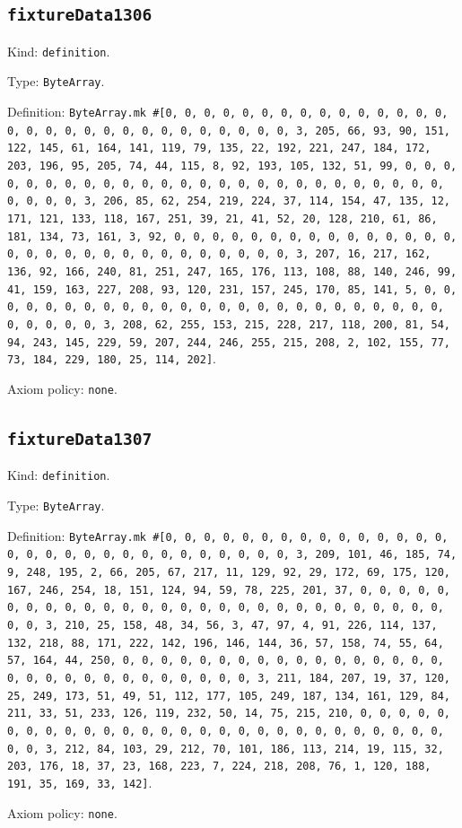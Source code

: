 \documentclass[11pt]{article}
\begin{document}
\subsection*{\texttt{fixtureData1306}}
\noindent Kind: \texttt{definition}.\par
\noindent Type: \texttt{ByteArray}.\par
\noindent Definition: \texttt{ByteArray.mk \#[0, 0, 0, 0, 0, 0, 0, 0, 0, 0, 0, 0, 0, 0, 0, 0, 0, 0, 0, 0, 0, 0, 0, 0, 0, 0, 0, 0, 0, 0, 3, 205, 66, 93, 90, 151, 122, 145, 61, 164, 141, 119, 79, 135, 22, 192, 221, 247, 184, 172, 203, 196, 95, 205, 74, 44, 115, 8, 92, 193, 105, 132, 51, 99, 0, 0, 0, 0, 0, 0, 0, 0, 0, 0, 0, 0, 0, 0, 0, 0, 0, 0, 0, 0, 0, 0, 0, 0, 0, 0, 0, 0, 0, 0, 3, 206, 85, 62, 254, 219, 224, 37, 114, 154, 47, 135, 12, 171, 121, 133, 118, 167, 251, 39, 21, 41, 52, 20, 128, 210, 61, 86, 181, 134, 73, 161, 3, 92, 0, 0, 0, 0, 0, 0, 0, 0, 0, 0, 0, 0, 0, 0, 0, 0, 0, 0, 0, 0, 0, 0, 0, 0, 0, 0, 0, 0, 0, 0, 3, 207, 16, 217, 162, 136, 92, 166, 240, 81, 251, 247, 165, 176, 113, 108, 88, 140, 246, 99, 41, 159, 163, 227, 208, 93, 120, 231, 157, 245, 170, 85, 141, 5, 0, 0, 0, 0, 0, 0, 0, 0, 0, 0, 0, 0, 0, 0, 0, 0, 0, 0, 0, 0, 0, 0, 0, 0, 0, 0, 0, 0, 0, 0, 3, 208, 62, 255, 153, 215, 228, 217, 118, 200, 81, 54, 94, 243, 145, 229, 59, 207, 244, 246, 255, 215, 208, 2, 102, 155, 77, 73, 184, 229, 180, 25, 114, 202]}.\par
\noindent Axiom policy: \texttt{none}.\par
\subsection*{\texttt{fixtureData1307}}
\noindent Kind: \texttt{definition}.\par
\noindent Type: \texttt{ByteArray}.\par
\noindent Definition: \texttt{ByteArray.mk \#[0, 0, 0, 0, 0, 0, 0, 0, 0, 0, 0, 0, 0, 0, 0, 0, 0, 0, 0, 0, 0, 0, 0, 0, 0, 0, 0, 0, 0, 0, 3, 209, 101, 46, 185, 74, 9, 248, 195, 2, 66, 205, 67, 217, 11, 129, 92, 29, 172, 69, 175, 120, 167, 246, 254, 18, 151, 124, 94, 59, 78, 225, 201, 37, 0, 0, 0, 0, 0, 0, 0, 0, 0, 0, 0, 0, 0, 0, 0, 0, 0, 0, 0, 0, 0, 0, 0, 0, 0, 0, 0, 0, 0, 0, 3, 210, 25, 158, 48, 34, 56, 3, 47, 97, 4, 91, 226, 114, 137, 132, 218, 88, 171, 222, 142, 196, 146, 144, 36, 57, 158, 74, 55, 64, 57, 164, 44, 250, 0, 0, 0, 0, 0, 0, 0, 0, 0, 0, 0, 0, 0, 0, 0, 0, 0, 0, 0, 0, 0, 0, 0, 0, 0, 0, 0, 0, 0, 0, 3, 211, 184, 207, 19, 37, 120, 25, 249, 173, 51, 49, 51, 112, 177, 105, 249, 187, 134, 161, 129, 84, 211, 33, 51, 233, 126, 119, 232, 50, 14, 75, 215, 210, 0, 0, 0, 0, 0, 0, 0, 0, 0, 0, 0, 0, 0, 0, 0, 0, 0, 0, 0, 0, 0, 0, 0, 0, 0, 0, 0, 0, 0, 0, 3, 212, 84, 103, 29, 212, 70, 101, 186, 113, 214, 19, 115, 32, 203, 176, 18, 37, 23, 168, 223, 7, 224, 218, 208, 76, 1, 120, 188, 191, 35, 169, 33, 142]}.\par
\noindent Axiom policy: \texttt{none}.\par
\end{document}
